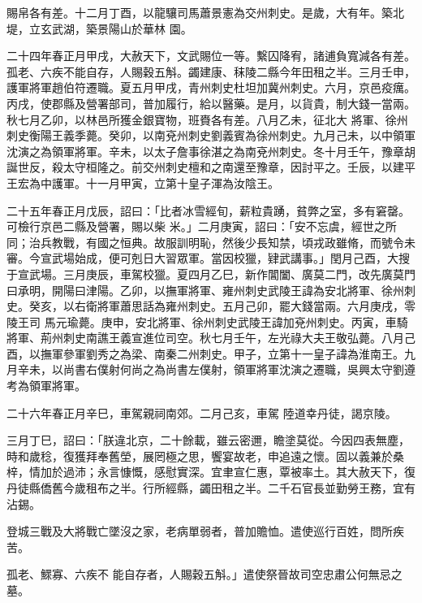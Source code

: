\begin{pinyinscope}
 賜帛各有差。十二月丁酉，以龍驤司馬蕭景憲為交州刺史。是歲，大有年。築北堤，立玄武湖，築景陽山於華林
 園。



 二十四年春正月甲戌，大赦天下，文武賜位一等。繫囚降宥，諸逋負寬減各有差。孤老、六疾不能自存，人賜穀五斛。蠲建康、秣陵二縣今年田租之半。三月壬申，護軍將軍趙伯符遷職。夏五月甲戌，青州刺史杜坦加冀州刺史。六月，京邑疫癘。丙戌，使郡縣及營署部司，普加履行，給以醫藥。是月，以貨貴，制大錢一當兩。秋七月乙卯，以林邑所獲金銀寶物，班賚各有差。八月乙未，征北大
 將軍、徐州刺史衡陽王義季薨。癸卯，以南兗州刺史劉義賓為徐州刺史。九月己未，以中領軍沈演之為領軍將軍。辛未，以太子詹事徐湛之為南兗州刺史。冬十月壬午，豫章胡誕世反，殺太守桓隆之。前交州刺史檀和之南還至豫章，因討平之。壬辰，以建平王宏為中護軍。十一月甲寅，立第十皇子渾為汝陰王。



 二十五年春正月戊辰，詔曰：「比者冰雪經旬，薪粒貴踴，貧弊之室，多有窘罄。可檢行京邑二縣及營署，賜以柴
 米。」二月庚寅，詔曰：「安不忘虞，經世之所同；治兵教戰，有國之恒典。故服訓明恥，然後少長知禁，頃戎政雖脩，而號令未審。今宣武場始成，便可剋日大習眾軍。當因校獵，肄武講事。」閏月己酉，大搜于宣武場。三月庚辰，車駕校獵。夏四月乙巳，新作閶闔、廣莫二門，改先廣莫門曰承明，開陽曰津陽。乙卯，以撫軍將軍、雍州刺史武陵王諱為安北將軍、徐州刺史。癸亥，以右衛將軍蕭思話為雍州刺史。五月己卯，罷大錢當兩。六月庚戌，零陵王司
 馬元瑜薨。庚申，安北將軍、徐州刺史武陵王諱加兗州刺史。丙寅，車騎將軍、荊州刺史南譙王義宣進位司空。秋七月壬午，左光祿大夫王敬弘薨。八月己酉，以撫軍參軍劉秀之為梁、南秦二州刺史。甲子，立第十一皇子諱為淮南王。九月辛未，以尚書右僕射何尚之為尚書左僕射，領軍將軍沈演之遷職，吳興太守劉遵考為領軍將軍。



 二十六年春正月辛巳，車駕親祠南郊。二月己亥，車駕
 陸道幸丹徒，謁京陵。



 三月丁巳，詔曰：「朕違北京，二十餘載，雖云密邇，瞻塗莫從。今因四表無塵，時和歲稔，復獲拜奉舊塋，展罔極之思，饗宴故老，申追遠之懷。固以義兼於桑梓，情加於過沛；永言慷慨，感慰實深。宜聿宣仁惠，覃被率土。其大赦天下，復丹徒縣僑舊今歲租布之半。行所經縣，蠲田租之半。二千石官長並勤勞王務，宜有沾錫。



 登城三戰及大將戰亡墜沒之家，老病單弱者，普加贍恤。遣使巡行百姓，問所疾苦。



 孤老、鰥寡、六疾不
 能自存者，人賜穀五斛。」遣使祭晉故司空忠肅公何無忌之墓。




\end{pinyinscope}
